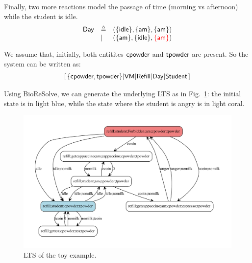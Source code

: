 Finally, two more reactions model the passage of time (morning vs afternoon) while the student is idle.
\[
\begin{array}{lll}
\mathsf{Day} & \triangleq & (\{\mathsf{idle}\},\{\mathsf{am}\},\{\mathsf{am}\})\\
& | & (\{\mathsf{am}\},\{\mathsf{idle}\},\textcolor{red}{\{\mathsf{am}\}})
\end{array}
\]

We assume that, initially, both entitites $\mathsf{cpowder}$ and $\mathsf{tpowder}$ are present.
So the system can be written as:
\[
[\,\{\mathsf{cpowder},\mathsf{tpowder}\} 
| \mathsf{VM}
| \mathsf{Refill}
| \mathsf{Day}
| \mathsf{Student}
\,]
\]

Using BioReSolve, we can generate the underlying LTS as in Fig.~\ref{fig:toylts}: the initial state is in light blue, while the state where the student is angry is in light coral.

\begin{figure}
\includegraphics[scale=.3]{toylts}
\caption{LTS of the toy example.}\label{fig:toylts}
\end{figure}